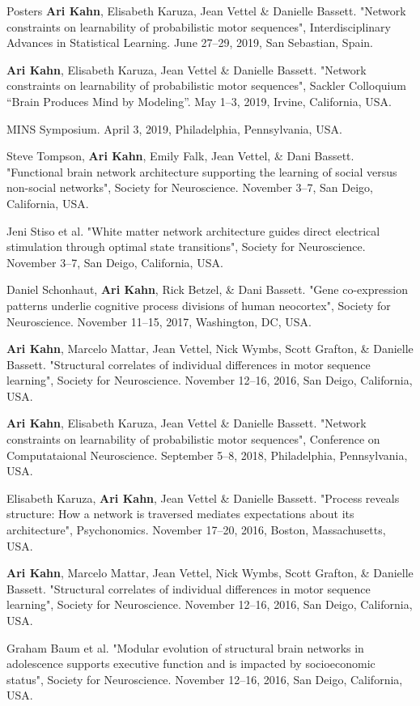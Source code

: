 \documentclass{resume} %
\begin{document}
\begin{rSection}{Posters}
\textbf{Ari Kahn}, Elisabeth Karuza, Jean Vettel \& Danielle Bassett. "Network constraints on learnability of probabilistic motor sequences", Interdisciplinary Advances in Statistical Learning. June 27--29, 2019, San Sebastian, Spain.

\textbf{Ari Kahn}, Elisabeth Karuza, Jean Vettel \& Danielle Bassett. "Network constraints on learnability of probabilistic motor sequences", Sackler Colloquium ``Brain Produces Mind by Modeling''. May 1--3, 2019, Irvine, California, USA.

MINS Symposium. April 3, 2019, Philadelphia, Pennsylvania, USA.

Steve Tompson, \textbf{Ari Kahn}, Emily Falk, Jean Vettel, \& Dani Bassett. "Functional brain network architecture supporting the learning of social versus non-social networks", Society for Neuroscience. November 3--7, San Deigo, California, USA.

Jeni Stiso et al. "White matter network architecture guides direct electrical stimulation through optimal state transitions", Society for Neuroscience. November 3--7, San Deigo, California, USA.

Daniel Schonhaut, \textbf{Ari Kahn}, Rick Betzel, \& Dani Bassett. "Gene co-expression patterns underlie cognitive process divisions of human neocortex", Society for Neuroscience. November 11--15, 2017, Washington, DC, USA.

\textbf{Ari Kahn}, Marcelo Mattar, Jean Vettel, Nick Wymbs, Scott Grafton, \& Danielle Bassett. "Structural correlates of individual differences in motor sequence learning", Society for Neuroscience. November 12--16, 2016, San Deigo, California, USA.

\textbf{Ari Kahn}, Elisabeth Karuza, Jean Vettel \& Danielle Bassett. "Network constraints on learnability of probabilistic motor sequences", Conference on Computataional Neuroscience. September 5--8, 2018, Philadelphia, Pennsylvania, USA.

Elisabeth Karuza, \textbf{Ari Kahn}, Jean Vettel \& Danielle Bassett. "Process reveals structure: How a network is traversed mediates expectations about its architecture", Psychonomics. November 17--20, 2016, Boston, Massachusetts, USA.

\textbf{Ari Kahn}, Marcelo Mattar, Jean Vettel, Nick Wymbs, Scott Grafton, \& Danielle Bassett. "Structural correlates of individual differences in motor sequence learning", Society for Neuroscience. November 12--16, 2016, San Deigo, California, USA.

Graham Baum et al. "Modular evolution of structural brain networks in adolescence supports executive function and is impacted by socioeconomic status", Society for Neuroscience. November 12--16, 2016, San Deigo, California, USA.


\end{rSection}
\end{document}
